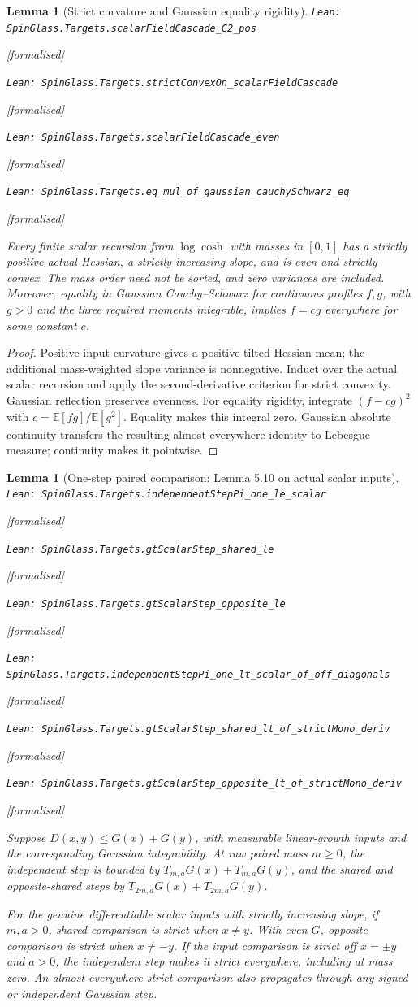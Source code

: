 \documentclass[11pt]{article}
\providecommand{\lean}[1]{\leavevmode\par\nopagebreak
  {\noindent\normalfont\footnotesize\raggedright\texttt{Lean: #1}\par}\nopagebreak}
\providecommand{\leanok}{\par\nopagebreak
  {\noindent\normalfont\footnotesize\textcolor{green!50!black}{[formalised]}\par}\nopagebreak}
\newtheorem{lemma}[theorem]{Lemma}
\newcommand{\E}{\mathbb{E}}
\begin{document}
\begin{lemma}[Strict curvature and Gaussian equality rigidity]
\lean{SpinGlass.Targets.scalarFieldCascade\_C2\_pos}\leanok
\lean{SpinGlass.Targets.strictConvexOn\_scalarFieldCascade}\leanok
\lean{SpinGlass.Targets.scalarFieldCascade\_even}\leanok
\lean{SpinGlass.Targets.eq\_mul\_of\_gaussian\_cauchySchwarz\_eq}\leanok
Every finite scalar recursion from $\log\cosh$ with masses in $[0,1]$ has a
strictly positive actual Hessian, a strictly increasing slope, and is even
and strictly convex. The mass order need not be sorted, and zero variances
are included. Moreover, equality in Gaussian Cauchy--Schwarz for continuous
profiles $f,g$, with $g>0$ and the three required moments integrable, implies
$f=cg$ everywhere for some constant $c$.
\end{lemma}
\begin{proof}
Positive input curvature gives a positive tilted Hessian mean; the additional
mass-weighted slope variance is nonnegative. Induct over the actual scalar
recursion and apply the second-derivative criterion for strict convexity.
Gaussian reflection preserves evenness. For equality rigidity, integrate
$(f-cg)^2$ with $c=\E[fg]/\E[g^2]$. Equality makes this integral zero.
Gaussian absolute continuity transfers the resulting almost-everywhere
identity to Lebesgue measure; continuity makes it pointwise.
\end{proof}
\begin{lemma}[One-step paired comparison: Lemma 5.10 on actual scalar inputs]
\lean{SpinGlass.Targets.independentStepPi\_one\_le\_scalar}\leanok
\lean{SpinGlass.Targets.gtScalarStep\_shared\_le}\leanok
\lean{SpinGlass.Targets.gtScalarStep\_opposite\_le}\leanok
\lean{SpinGlass.Targets.independentStepPi\_one\_lt\_scalar\_of\_off\_diagonals}\leanok
\lean{SpinGlass.Targets.gtScalarStep\_shared\_lt\_of\_strictMono\_deriv}\leanok
\lean{SpinGlass.Targets.gtScalarStep\_opposite\_lt\_of\_strictMono\_deriv}\leanok
Suppose $D(x,y)\le G(x)+G(y)$, with measurable linear-growth inputs and
the corresponding Gaussian integrability. At raw paired mass $m\ge0$,
the independent step is bounded by $T_{m,a}G(x)+T_{m,a}G(y)$, and the shared
and opposite-shared steps by $T_{2m,a}G(x)+T_{2m,a}G(y)$.

For the genuine differentiable scalar inputs with strictly increasing slope,
if $m,a>0$, shared comparison is strict when $x\ne y$. With even $G$,
opposite comparison is strict when $x\ne-y$. If the input comparison is
strict off $x=\pm y$ and $a>0$, the independent step makes it strict
everywhere, including at mass zero. An almost-everywhere strict comparison
also propagates through any signed or independent Gaussian step.
\end{lemma}
\end{document}

